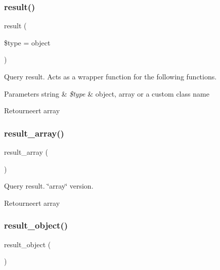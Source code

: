 \subsubsection{\texorpdfstring{result()}{result()}}
{\footnotesize\ttfamily result (\begin{DoxyParamCaption}\item[{}]{\$type = {\ttfamily \textquotesingle{}object\textquotesingle{}} }\end{DoxyParamCaption})}

Query result. Acts as a wrapper function for the following functions.


\begin{DoxyParams}[1]{Parameters}
string & {\em \$type} & \textquotesingle{}object\textquotesingle{}, \textquotesingle{}array\textquotesingle{} or a custom class name \\
\hline
\end{DoxyParams}
\begin{DoxyReturn}{Retourneert}
array 
\end{DoxyReturn}
\mbox{\label{class_c_i___d_b__result_a444f7dd61bfbe3931a7188adad61feae}} 
\subsubsection{\texorpdfstring{result\_array()}{result\_array()}}
{\footnotesize\ttfamily result\+\_\+array (\begin{DoxyParamCaption}{ }\end{DoxyParamCaption})}

Query result. \char`\"{}array\char`\"{} version.

\begin{DoxyReturn}{Retourneert}
array 
\end{DoxyReturn}
\mbox{\label{class_c_i___d_b__result_a266a17f340dab35b8f2858931ff772a2}} 
\subsubsection{\texorpdfstring{result\_object()}{result\_object()}}
{\footnotesize\ttfamily result\+\_\+object (\begin{DoxyParamCaption}{ }\end{DoxyParamCaption})}

